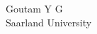 
\vfill %


{\centering \large 
\hfill Goutam Y G \\
\hfill Saarland University \\

\HRule{1pt}} %


\clearpage %


\newpage

